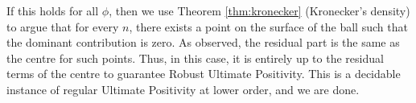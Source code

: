If this holds for all $\phi$, then we use Theorem \ref{thm:kronecker} (Kronecker's density) to argue that for every $n$, there exists a point on the surface of the ball such that the dominant contribution is zero. As observed, the residual part is the same as the centre for such points. Thus, in this case, it is entirely up to the residual terms of the centre to guarantee Robust Ultimate Positivity. This is a decidable instance of regular Ultimate Positivity at lower order, and we are done.
